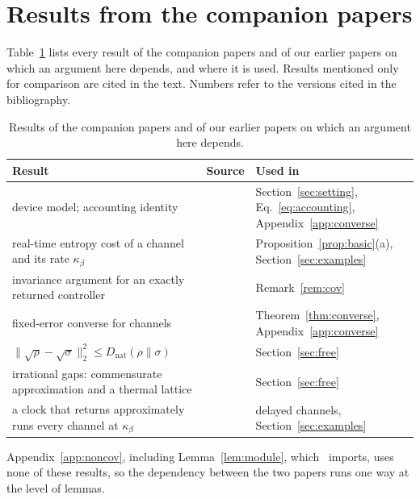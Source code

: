 \documentclass[11pt]{article}
\theoremstyle{definition}
\theoremstyle{remark}
\newcommand{\Trt}{\kappa_\beta}
\begin{document}
\section{Results from the companion papers}\label{app:companions}

Table~\ref{tab:companions} lists every result of the companion papers and of our earlier papers on which an argument here depends, and where it is used. Results mentioned only for comparison are cited in the text. Numbers refer to the versions cited in the bibliography.

\begin{table}[ht]
\centering\small
\begin{tabular}{@{}>{\raggedright\arraybackslash}p{}>{\raggedright\arraybackslash}p{}>{\raggedright\arraybackslash}p{}@{}}
\toprule
Result & Source & Used in\\
\midrule
device model; accounting identity & \cite[Sec.~2, Lemma~4]{SaveWork} & Section~\ref{sec:setting}, Eq.~\eqref{eq:accounting}, Appendix~\ref{app:converse}\\
real-time entropy cost of a channel and its rate $\Trt$ & \cite[Def.~1]{SaveWork} & Proposition~\ref{prop:basic}(a), Section~\ref{sec:examples}\\
invariance argument for an exactly returned controller & \cite[Prop.~10]{SaveWork} & Remark~\ref{rem:cov}\\
fixed-error converse for channels & \cite[Thm.~6, App.~B]{SaveWork} & Theorem~\ref{thm:converse}, Appendix~\ref{app:converse}\\
$\|\sqrt\rho-\sqrt\sigma\|_2^2\le D_{\mathrm{nat}}(\rho\|\sigma)$ & \cite[Eq.~(15)]{SaveWork} & Section~\ref{sec:free}\\
irrational gaps: commensurate approximation and a thermal lattice & \cite[Thm.~9, App.~C]{SaveWork} & Section~\ref{sec:free}\\
a clock that returns approximately runs every channel at $\Trt$ & \cite[Thm.~11]{SaveWork} & delayed channels, Section~\ref{sec:examples}\\
\bottomrule
\end{tabular}
\caption{Results of the companion papers and of our earlier papers on which an argument here depends.}\label{tab:companions}
\end{table}

Appendix~\ref{app:noncov}, including Lemma~\ref{lem:module}, which~\cite{SaveWork} imports, uses none of these results, so the dependency between the two papers runs one way at the level of lemmas.



\end{document}
